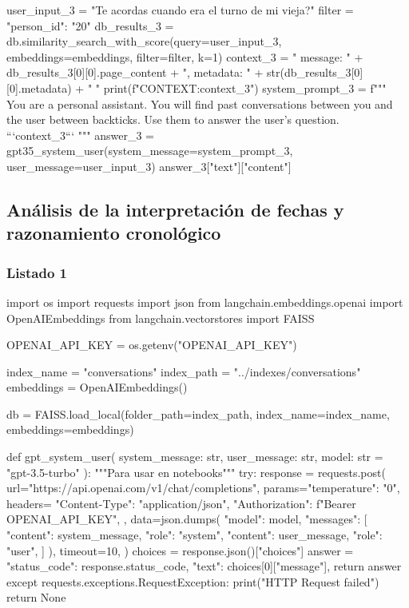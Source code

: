 \begin{APACode}
user_input_3 = "Te acordas cuando era el turno de mi vieja?" 
filter = {"person_id": "20"}
db_results_3 = db.similarity_search_with_score(query=user_input_3, 
                                               embeddings=embeddings, 
                                               filter=filter, k=1) 
context_3 = "{ message: " + db_results_3[0][0].page_content + 
            ", metadata: " + str(db_results_3[0][0].metadata) + " }" 
print(f"CONTEXT:{context_3}")
system_prompt_3 = f"""
You are a personal assistant. You will find past conversations between 
you and the user between backticks. Use them to answer the user's question.
```{context_3}``` 
"""
answer_3 = gpt35_system_user(system_message=system_prompt_3, 
                             user_message=user_input_3) 
answer_3["text"]["content"]
\end{APACode}

\subsection{Análisis de la interpretación de fechas y razonamiento cronológico}

\subsubsection{Listado 1}
\label{anexo:code-4-1-8-1}

\begin{APACode}
import os
import requests
import json
from langchain.embeddings.openai import OpenAIEmbeddings
from langchain.vectorstores import FAISS

OPENAI_API_KEY = os.getenv("OPENAI_API_KEY")

index_name = "conversations"
index_path = "../indexes/conversations"
embeddings = OpenAIEmbeddings()

db = FAISS.load_local(folder_path=index_path, index_name=index_name, 
                      embeddings=embeddings)

def gpt_system_user(
    system_message: str, user_message: str, model: str = "gpt-3.5-turbo"
):
    """Para usar en notebooks"""
    try:
        response = requests.post(
            url="https://api.openai.com/v1/chat/completions",
            params={"temperature": "0"},
            headers={
                "Content-Type": "application/json",
                "Authorization": f"Bearer {OPENAI_API_KEY}",
            },
            data=json.dumps({
                "model": model,
                "messages": [
                    {"content": system_message, "role": "system"},
                    {"content": user_message, "role": "user"},
                ]
            }),
            timeout=10,
        )
        choices = response.json()["choices"]
        answer = {
            "status_code": response.status_code,
            "text": choices[0]["message"],
        }
        return answer
    except requests.exceptions.RequestException:
        print("HTTP Request failed")
        return None
\end{APACode}

